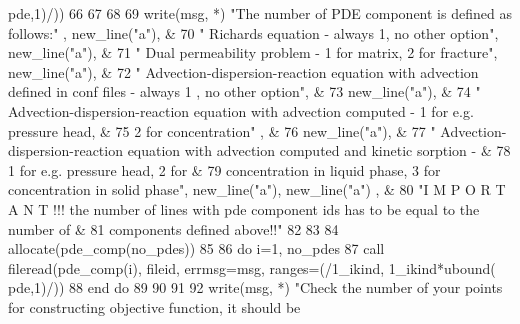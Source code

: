 \begin{DoxyCode}
{      pde,1)/))}
66 \textcolor{comment}{      }
67 \textcolor{comment}{      }
68 \textcolor{comment}{      }
69 \textcolor{comment}{      }\textcolor{keyword}{write}(msg, *) \textcolor{stringliteral}{"The number of PDE component is defined as follows:"}\textcolor{comment}{ , new\_line(}\textcolor{stringliteral}{"a"}\textcolor{comment}{), &}
70 \textcolor{comment}{           }\textcolor{stringliteral}{"      Richards equation - always 1, no other option"},  new\_line\textcolor{comment}{(}\textcolor{stringliteral}{"a"}\textcolor{comment}{), &}
71 \textcolor{comment}{           }\textcolor{stringliteral}{"      Dual permeability problem - 1 for matrix, 2 for fracture"}\textcolor{comment}{,  new\_line(}\textcolor{stringliteral}{"a"}\textcolor{comment}{), &}
72 \textcolor{comment}{           }\textcolor{stringliteral}{"      Advection-dispersion-reaction equation with advection defined in conf files - always 1 ,
       no other option"}\textcolor{comment}{, &}
73 \textcolor{comment}{           new\_line(}\textcolor{stringliteral}{"a"}), &
74            \textcolor{stringliteral}{"      Advection-dispersion-reaction equation with advection computed - 1 for e.g. pressure
       head, &}
75 \textcolor{stringliteral}{}\textcolor{stringliteral}{            2 for concentration"} , & 
76            new\_line(\textcolor{stringliteral}{"a"}), &
77            \textcolor{stringliteral}{"      Advection-dispersion-reaction equation with advection computed and kinetic sorption - & }
78 \textcolor{stringliteral}{}\textcolor{stringliteral}{           1 for e.g. pressure head, 2 for &}
79 \textcolor{stringliteral}{}\textcolor{stringliteral}{           concentration in liquid phase, 3 for concentration in solid phase"}\textcolor{comment}{, new\_line(}\textcolor{stringliteral}{"a"}\textcolor{comment}{), new\_line(}\textcolor{stringliteral}{"a"}\textcolor{comment}{)
      , &}
80 \textcolor{comment}{           }\textcolor{stringliteral}{"I M P O R T A N T !!! the number of lines with pde component ids has to be equal to the number
       of &}
81 \textcolor{stringliteral}{}\textcolor{stringliteral}{           components defined above!!"}
82            
83       
84       \textcolor{keyword}{allocate}(pde\_comp(no\_pdes))
85       
86       \textcolor{keywordflow}{do} i=1, no\_pdes 
87         \textcolor{keyword}{call }fileread(pde\_comp(i), fileid, errmsg=msg, ranges=(/1\_ikind,\textcolor{comment}{ 1\_ikind*ubound(
      pde,1)/))}
88 \textcolor{comment}{}\textcolor{keywordflow}{      end do}
89            
90       
91       
92       \textcolor{keyword}{write}(msg, *) \textcolor{stringliteral}{"Check the number of your points for constructing objective function, it should be
}
\end{DoxyCode}
